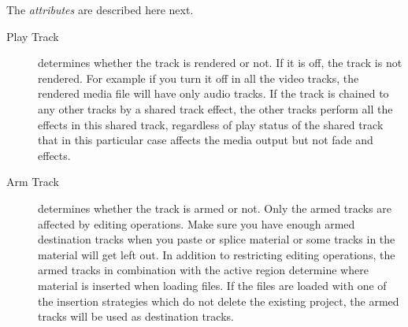 The \textit{attributes} are described here next.

\begin{description}
    \item[Play Track] determines whether the track is rendered or not. If it is off, the track is not rendered.  For example if you turn it off in all the video tracks, the rendered media file will have only audio tracks.  If the track is chained to any other tracks by a shared track effect, the other tracks perform all the effects in this shared track, regardless of play status of the shared track that in this particular case affects the media output but not fade and effects.
    \item[Arm Track] determines whether the track is armed or not.  Only the armed tracks are affected by editing operations. Make sure you have enough armed destination tracks when you paste or splice material or some tracks in the material will get left out.  In addition to restricting editing operations, the armed tracks in combination with the active region determine where material is inserted when loading files.  If the files are loaded with one of the insertion strategies which do not delete the existing project, the armed  tracks will be used as destination tracks.
\end{description}

